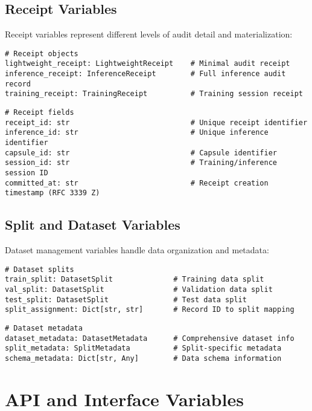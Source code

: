 \documentclass[12pt,a4paper]{article}
\begin{document}
\subsection{Receipt Variables}

Receipt variables represent different levels of audit detail and materialization:

\begin{lstlisting}[caption=Receipt Objects]
# Receipt objects
lightweight_receipt: LightweightReceipt    # Minimal audit receipt
inference_receipt: InferenceReceipt        # Full inference audit record
training_receipt: TrainingReceipt          # Training session receipt
\end{lstlisting}

\begin{lstlisting}[caption=Receipt Fields]
# Receipt fields
receipt_id: str                            # Unique receipt identifier
inference_id: str                          # Unique inference identifier
capsule_id: str                            # Capsule identifier
session_id: str                            # Training/inference session ID
committed_at: str                          # Receipt creation timestamp (RFC 3339 Z)
\end{lstlisting}

\subsection{Split and Dataset Variables}

Dataset management variables handle data organization and metadata:

\begin{lstlisting}[caption=Dataset Splits]
# Dataset splits
train_split: DatasetSplit              # Training data split
val_split: DatasetSplit                # Validation data split  
test_split: DatasetSplit               # Test data split
split_assignment: Dict[str, str]       # Record ID to split mapping
\end{lstlisting}

\begin{lstlisting}[caption=Dataset Metadata]
# Dataset metadata
dataset_metadata: DatasetMetadata      # Comprehensive dataset info
split_metadata: SplitMetadata          # Split-specific metadata
schema_metadata: Dict[str, Any]        # Data schema information
\end{lstlisting}

\section{API and Interface Variables}
\end{document}
